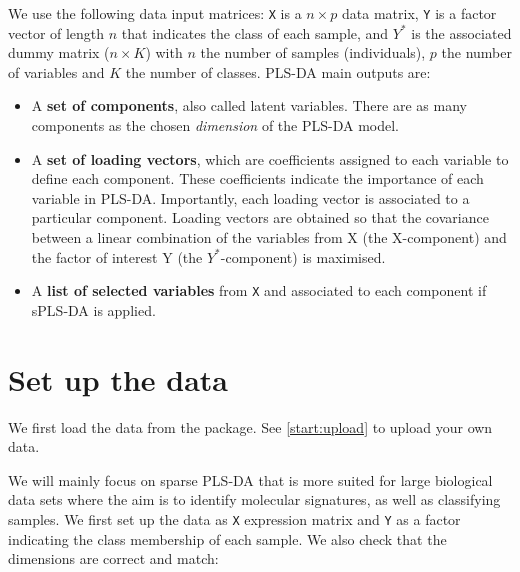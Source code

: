 \documentclass[]{book}
\newenvironment{Shaded}{\begin{snugshade}}{\end{snugshade}}
\newcommand{\CommentTok}[1]{\textcolor[rgb]{0.56,0.35,0.01}{\textit{#1}}}
\newcommand{\KeywordTok}[1]{\textcolor[rgb]{0.13,0.29,0.53}{\textbf{#1}}}
\newcommand{\NormalTok}[1]{#1}
\newcommand{\OperatorTok}[1]{\textcolor[rgb]{0.81,0.36,0.00}{\textbf{#1}}}
\newcommand{\StringTok}[1]{\textcolor[rgb]{0.31,0.60,0.02}{#1}}
\begin{document}
We use the following data input matrices: \texttt{X} is a \(n \times p\) data matrix, \texttt{Y} is a factor vector of length \(n\) that indicates the class of each sample, and \(Y^*\) is the associated dummy matrix (\(n \times K\)) with \(n\) the number of samples (individuals), \(p\) the number of variables and \(K\) the number of classes. PLS-DA main outputs are:

\begin{itemize}
\item
  A \textbf{set of components}, also called latent variables. There are as many components as the chosen
  \emph{dimension} of the PLS-DA model.
\item
  A \textbf{set of loading vectors}, which are coefficients assigned to each variable to define each component. These coefficients indicate the importance of each variable in PLS-DA. Importantly, each loading vector is associated to a particular component. Loading vectors are obtained so that the covariance between a linear combination of the variables from X (the X-component) and the factor of interest Y (the \(Y^*\)-component) is maximised.
\item
  A \textbf{list of selected variables} from \texttt{X} and associated to each component if sPLS-DA is applied.
\end{itemize}

\hypertarget{set-up-the-data}{%
\section{Set up the data}\label{set-up-the-data}}

We first load the data from the package. See \ref{start:upload} to upload your own data.

We will mainly focus on sparse PLS-DA that is more suited for large biological data sets where the aim is to identify molecular signatures, as well as classifying samples. We first set up the data as \texttt{X} expression matrix and \texttt{Y} as a factor indicating the class membership of each sample. We also check that the dimensions are correct and match:

\begin{Shaded}
\end{Shaded}
\end{document}
